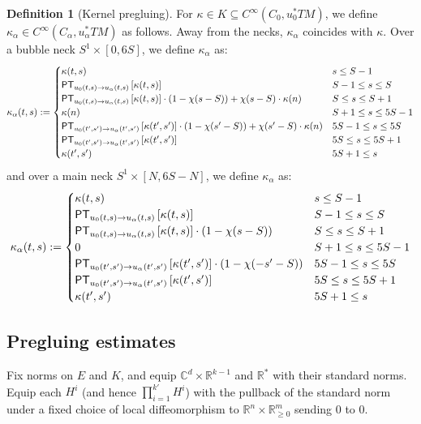 \documentclass[12pt]{article}
\theoremstyle{definition}
\newtheorem{definition}[theorem]{Definition}
\theoremstyle{remark}
\numberwithin{equation}{subsection}
\newcommand{\CC}{\mathbb C}
\newcommand{\RR}{\mathbb R}
\newcommand{\PT}{\mathsf{PT}}
\begin{document}
\begin{definition}[Kernel pregluing]\label{kernelpregluingHF}
For $\kappa\in K\subseteq C^\infty(C_0,u_0^\ast TM)$, we define $\kappa_\alpha\in C^\infty(C_\alpha,u_\alpha^\ast TM)$ as follows.  Away from the necks, $\kappa_\alpha$ coincides with $\kappa$.  Over a bubble neck $S^1\times[0,6S]$, we define $\kappa_\alpha$ as:
\begin{equation}\label{kernelpregluingformulaHFbubble}
\kappa_\alpha(t,s):=\begin{cases}
\kappa(t,s)&s\leq S-1\cr
\PT_{u_0(t,s)\to u_\alpha(t,s)}\left[\kappa(t,s)\right]&S-1\leq s\leq S\cr
\PT_{u_0(t,s)\to u_\alpha(t,s)}\left[\kappa(t,s)\right]\cdot(1-\chi(s-S))+\chi(s-S)\cdot \kappa(n)&S\leq s\leq S+1\cr
\kappa(n)&S+1\leq s\leq 5S-1\cr
\PT_{u_0(t',s')\to u_\alpha(t',s')}\left[\kappa(t',s')\right]\cdot(1-\chi(s'-S))+\chi(s'-S)\cdot \kappa(n)&5S-1\leq s\leq 5S\cr
\PT_{u_0(t',s')\to u_\alpha(t',s')}\left[\kappa(t',s')\right]&5S\leq s\leq 5S+1\cr
\kappa(t',s')&5S+1\leq s
\end{cases}
\end{equation}
and over a main neck $S^1\times[N,6S-N]$, we define $\kappa_\alpha$ as:
\begin{equation}\label{kernelpregluingformulaHFmain}
\kappa_\alpha(t,s):=\begin{cases}
\kappa(t,s)&s\leq S-1\cr
\PT_{u_0(t,s)\to u_\alpha(t,s)}\left[\kappa(t,s)\right]&S-1\leq s\leq S\cr
\PT_{u_0(t,s)\to u_\alpha(t,s)}\left[\kappa(t,s)\right]\cdot(1-\chi(s-S))&S\leq s\leq S+1\cr
0&S+1\leq s\leq 5S-1\cr
\PT_{u_0(t',s')\to u_\alpha(t',s')}\left[\kappa(t',s')\right]\cdot(1-\chi(-s'-S))&5S-1\leq s\leq 5S\cr
\PT_{u_0(t',s')\to u_\alpha(t',s')}\left[\kappa(t',s')\right]&5S\leq s\leq 5S+1\cr
\kappa(t',s')&5S+1\leq s
\end{cases}
\end{equation}
\end{definition}

\subsection{Pregluing estimates}

Fix norms on $E$ and $K$, and equip $\CC^d\times\RR^{k-1}$ and $\RR^\ast$ with their standard norms.  Equip each $H^i$ (and hence $\prod_{i=1}^{k\prime}H^i$) with the pullback of the standard norm under a fixed choice of local diffeomorphism to $\RR^n\times\RR^m_{\geq 0}$ sending $0$ to $0$.
\end{document}
